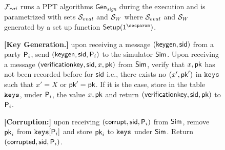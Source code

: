 
\newcommand{\Gen}{\ensuremath{\mathsf{Gen}}}

\newcommand{\anonymouskeymap}{\ensuremath{\mathtt{anonymous\_key\_map}}}
\newcommand{\anonymouskeylist}{\mathcal{W}}
\renewcommand{\sim}{\simulator}

\begin{figure}
\eprint{\footnotesize}{\scriptsize} 
\begin{tcolorbox}[left=2pt,right=2pt]
	{  $ \mathcal{F}_{\textsf{rvrf}} $ runs a PPT algorithms  $\Gen_{sign} $ during the execution and is parametrized with  sets $ {\mathcal{S}}_{eval} $ and $ {\mathcal{S}}_W $ where $ {\mathcal{S}}_{eval} $ and $ {\mathcal{S}}_W $ generated by a set up function $ \mathsf{Setup}(1^\secparam) $.
		
				
			\textbf{[Key Generation.]} upon receiving a message $(\mathsf{keygen}, \textsf{sid})$ from a party $\mathsf{P}_i$, send $(\mathsf{keygen}, \textsf{sid}, \mathsf{P}_i)$ to the simulator $\mathsf{Sim}$.
			Upon receiving a message $(\mathsf{verificationkey}, \textsf{sid}, x,\mathsf{pk})$ from $\mathsf{Sim}$, verify that $x,\mathsf{pk}$ has not been recorded before for $ \textsf{sid} $ i.e., there exists no $ (x', \mathsf{pk}') $ in $ \texttt{keys} $ such that $ x' = X $ or $ \mathsf{pk}' = \mathsf{pk} $. If it is the case, store in the table $\texttt{keys}$, under $\mathsf{P}_i$, the value $x,\mathsf{pk}$ and return $(\mathsf{verificationkey}, \textsf{sid}, \mathsf{pk})$ to $ \mathsf{P}_i$.
				
				
			\textbf{[Corruption:] } 
			upon receiving $ (\mathsf{corrupt}, \textsf{sid}, \mathsf{P}_i) $ from $ \mathsf{Sim} $, remove $ \mathsf{pk}_i $ from $ \texttt{keys}[\mathsf{P}_i] $ and store $ \mathsf{pk}_i $ to $ \texttt{keys} $ under $ \sim $. Return $ (\mathsf{corrupted}, \textsf{sid},\mathsf{P}_i) $.
			
}
\end{tcolorbox}
\end{figure}
